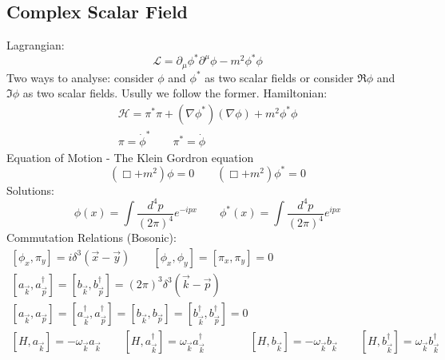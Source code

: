\documentclass{article}
\begin{document}
\subsection{Complex Scalar Field}
Lagrangian:
\begin{equation*}
    \mathcal{L} = \partial_\mu\phi^*\partial^\mu\phi  - m^2\phi^*\phi
\end{equation*}
Two ways to analyse: consider $\phi$ and $\phi^*$ as two scalar fields or consider $\Re{\phi}$ and $\Im{\phi}$ as two scalar fields. Usully we follow the former.
\newline
Hamiltonian:
\begin{equation*}
\begin{gathered}
    \mathcal{H} = \pi^*\pi + \left(\nabla \phi^*\right)\left(\nabla \phi\right) + m^2\phi^*\phi
    \\
    \pi = \dot{\phi}^*
    \qquad
    \pi^* = \dot{\phi}
\end{gathered}
\end{equation*}
Equation of Motion - The Klein Gordron equation
\begin{equation*}
    \left(\Box + m^2\right)\phi = 0
    \qquad
    \left(\Box + m^2\right)\phi^* = 0
\end{equation*}
Solutions:
\begin{equation*}
    \phi(x) = \int \frac{d^4p}{(2\pi)^4}e^{-ipx}
    \qquad
    \phi^*(x) = \int \frac{d^4p}{(2\pi)^4}e^{ipx}
\end{equation*}
Commutation Relations (Bosonic):
\begin{equation*}
\begin{gathered}
    \left[\phi_x, \pi_y\right] = i\delta^3(\vec{x} - \vec{y})
    \qquad
    \left[\phi_x, \phi_y\right] =
    \left[\pi_x, \pi_y\right] = 0
    \\
    \left[a_{\vec{k}}, a^\dagger_{\vec{p}}\right] =
    \left[b_{\vec{k}}, b^\dagger_{\vec{p}}\right] =
    \left(2\pi\right)^3\delta^3(\vec{k} - \vec{p})
    \\
    \left[a_{\vec{k}}, a_{\vec{p}}\right] =
    \left[a^\dagger_{\vec{k}}, a^\dagger_{\vec{p}}\right] = 
    \left[b_{\vec{k}}, b_{\vec{p}}\right] =
    \left[b^\dagger_{\vec{k}}, b^\dagger_{\vec{p}}\right] = 0
    \\
    \left[H, a_{\vec{k}}\right] = -\omega_{\vec{k}}a_{\vec{k}}
    \qquad
    \left[H, a^\dagger_{\vec{k}}\right] = \omega_{\vec{k}}a^\dagger_{\vec{k}}
    \qquad \qquad
    \left[H, b_{\vec{k}}\right] = -\omega_{\vec{k}}b_{\vec{k}}
    \qquad
    \left[H, b^\dagger_{\vec{k}}\right] = \omega_{\vec{k}}b^\dagger_{\vec{k}}
\end{gathered}
\end{equation*}
\end{document}
